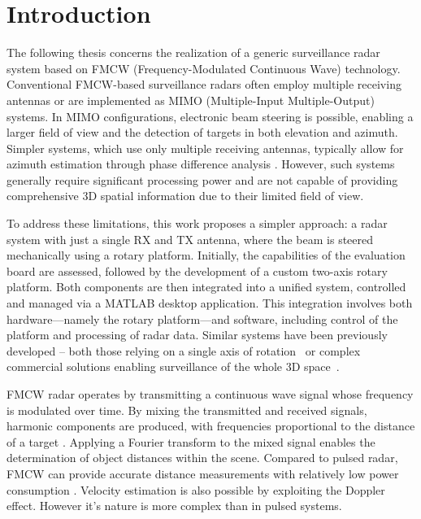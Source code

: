 
\chapter*{Introduction}

The following thesis concerns the realization of a generic surveillance radar system based on FMCW (Frequency-Modulated Continuous Wave) technology.
Conventional FMCW-based surveillance radars often employ multiple receiving antennas or are implemented as MIMO (Multiple-Input Multiple-Output) systems.
In MIMO configurations, electronic beam steering is possible, enabling a larger field of view and the detection of targets in both elevation and azimuth.
Simpler systems, which use only multiple receiving antennas, typically allow for azimuth estimation through phase difference analysis \cite{sandeep2018}.
However, such systems generally require significant processing power and are not capable of providing comprehensive 3D spatial information due to their limited field of view.

To address these limitations, this work proposes a simpler approach: a radar system with just a single RX and TX antenna, where the beam is steered mechanically using a rotary platform.
Initially, the capabilities of the \sidar evaluation board are assessed, followed by the development of a custom two-axis rotary platform.
Both components are then integrated into a unified system, controlled and managed via a MATLAB desktop application.
This integration involves both hardware—namely the rotary platform—and software, including control of the platform and processing of radar data.
Similar systems have been previously developed -- both those relying on a single axis of rotation~\cite{nowok2017, vivet2013} or complex commercial solutions enabling surveillance of the whole 3D space~\cite{blighter}.

FMCW radar operates by transmitting a continuous wave signal whose frequency is modulated over time.
By mixing the transmitted and received signals, harmonic components are produced, with frequencies proportional to the distance of a target \cite{graham2005}.
Applying a Fourier transform to the mixed signal enables the determination of object distances within the scene.
Compared to pulsed radar, FMCW can provide accurate distance measurements with relatively low power consumption \cite{jankiraman2018}.
Velocity estimation is also possible by exploiting the Doppler effect.
However it's nature is more complex than in pulsed systems.


